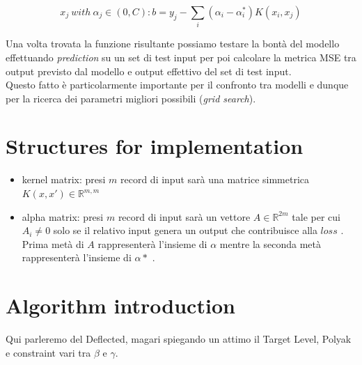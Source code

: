 \documentclass[12pt]{article}
\begin{document}
	\begin{equation*}
		x_j \  with\  \alpha_j \in(0,C): b = y_j - \sum_i(\alpha_i - \alpha_i^*)K(x_i,x_j)
	\end{equation*}

	Una volta trovata la funzione risultante possiamo testare la bontà del modello effettuando \textit{prediction} su un set di test input per poi calcolare la metrica MSE tra output previsto dal modello e output effettivo del set di test input.\\
Questo fatto è particolarmente importante per il confronto tra modelli e dunque per la ricerca dei parametri migliori possibili (\textit{grid search}).


	\section{Structures for implementation}
	\begin{itemize}
		\item kernel matrix: presi $m$ record di input sarà una matrice simmetrica $ K(x,x') \in \mathbb{R}^{m,m}$
		\item alpha matrix: presi $m$ record di input sarà un vettore $ A \in \mathbb{R}^{2m} $ tale per cui $A_i \neq 0$ solo se il relativo input genera un output che contribuisce alla $loss$ . Prima metà di $A$ rappresenterà l'insieme di $\alpha$ mentre la seconda metà rappresenterà l'insieme di $\alpha*$ .
	\end{itemize}

	\section{Algorithm introduction}
	Qui parleremo del Deflected, magari spiegando un attimo il Target Level, Polyak e constraint vari tra $\beta$ e $\gamma$.
\end{document}
